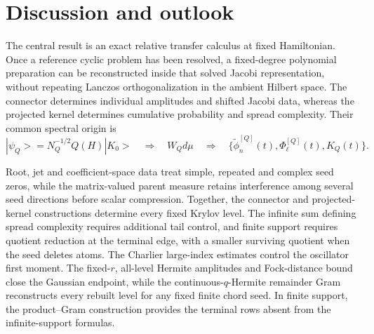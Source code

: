 \documentclass[a4paper,11pt]{article}
\def\ket#1{|#1>}%
\def\dd{d}%
\theoremstyle{definition}
\theoremstyle{remark}
\newcommand{\ket}[1]{|#1\rangle}
\newcommand{\dd}{\mathrm d}
\begin{document}
\section{Discussion and outlook}
\label{sec:discussion}

The central result is an exact relative transfer calculus at fixed Hamiltonian.  Once a reference
cyclic problem has been resolved, a fixed-degree polynomial preparation can be reconstructed
inside that solved Jacobi representation, without repeating Lanczos orthogonalization in the
ambient Hilbert space.  The connector determines individual amplitudes and shifted Jacobi data,
whereas the projected kernel determines cumulative probability and spread complexity.  Their
common spectral origin is
\begin{equation}
   \ket{\psi_Q}=N_Q^{-1/2}Q(H)\ket{K_0}
   \quad\Longrightarrow\quad
   W_Q\dd\mu
   \quad\Longrightarrow\quad
   \{\widetilde\phi_n^{[Q]}(t),\Phi_\ell^{[Q]}(t),K_Q(t)\}.
\end{equation}

Root, jet and coefficient-space data treat simple, repeated and complex seed zeros, while the
matrix-valued parent measure retains interference among several seed directions before scalar
compression.     Together, the connector and projected-kernel
constructions determine every fixed Krylov level.  The infinite sum defining
spread complexity 
requires additional tail control, and finite support requires quotient reduction at the terminal edge, with a smaller surviving
quotient when the seed deletes atoms.  The Charlier large-index
estimates control the oscillator first moment.  The fixed-$r$, all-level Hermite amplitudes and Fock-distance
bound close the Gaussian endpoint, while the continuous-$q$-Hermite remainder Gram reconstructs
every rebuilt level for any fixed finite chord seed.  In finite support, the product--Gram
construction provides the terminal rows absent from the infinite-support formulas.
\end{document}

